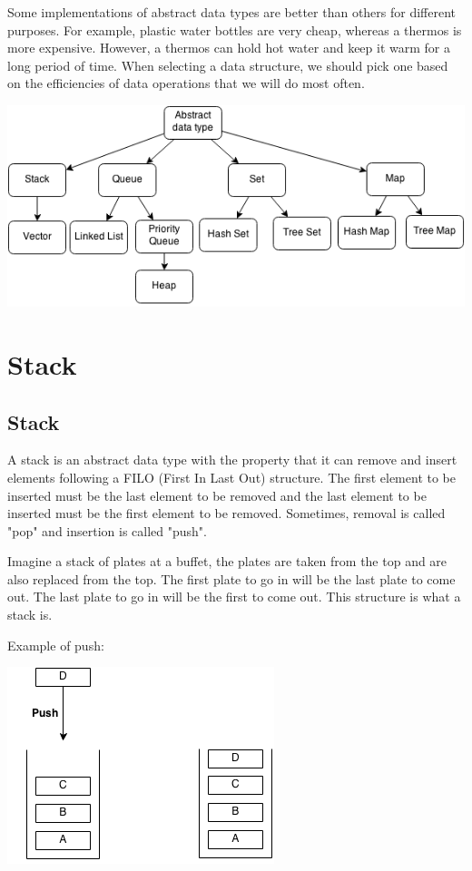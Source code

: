 \documentclass[11pt,oneside]{book}
\makeatletter
\def\maxwidth#1{\ifdim\Gin@nat@width>#1 #1\else\Gin@nat@width\fi}
\makeatother
\begin{document}
Some implementations of abstract data types are better than others for different purposes. For example, plastic water bottles are very cheap, whereas a thermos is more expensive. However, a thermos can hold hot water and keep it warm for a long period of time. When selecting a data structure, we should pick one based on the efficiencies of data operations that we will do most often.

\vspace{5px}\includegraphics[width=\maxwidth{\textwidth}]{adt.png}


    \chapter{ Stack }
        \section{ Stack }
        

A stack is an abstract data type with the property that it can remove and insert elements following a FILO (First In Last Out) structure. The first element to be inserted must be the last element to be removed and the last element to be inserted must be the first element to be removed. Sometimes, removal is called "pop" and insertion is called "push".

Imagine a stack of plates at a buffet, the plates are taken from the top and are also replaced from the top. The first plate to go in will be the last plate to come out. The last plate to go in will be the first to come out. This structure is what a stack is.

Example of push:

\vspace{5px}\includegraphics[width=\maxwidth{\textwidth}]{stack.png}
\end{document}
